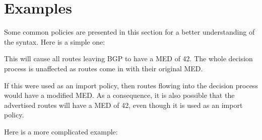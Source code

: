 \section{Examples}
Some common policies are presented in this section for a better understanding of
the syntax.  Here is a simple one:

\noindent{}

This will cause all routes leaving BGP to have a MED of 42.  The whole decision
process is unaffected as routes come in with their original MED.  

If this were used as an import policy, then routes flowing into the decision
process would have a modified MED.  As a consequence, it is also possible that
the advertised routes will have a MED of 42, even though it is used as an import
policy.

\newpage
Here is a more complicated example:

